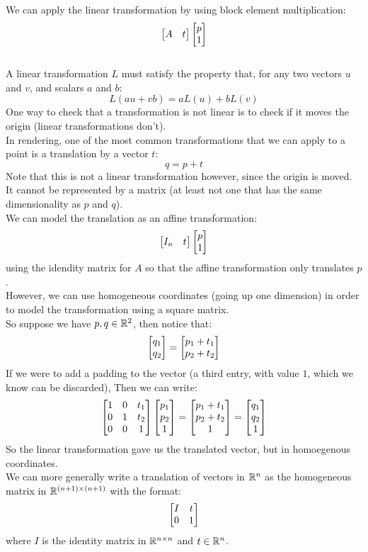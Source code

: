 \documentclass[12pt]{article}
\begin{document}
We can apply the linear transformation
by using block element multiplication:
\[ \begin{bmatrix} {A} & {t} \end{bmatrix} \begin{bmatrix} {p}\\{1} \end{bmatrix} \] \\

A linear transformation $L$ must satisfy the
property that, for any two vectors $u$ and $v$,
and scalars $a$ and $b$:
\[ L(au + vb) = aL(u) + bL(v) \]
One way to check that a transformation is not linear
is to check if it moves the origin (linear
transformations don't). \\

In rendering, one of the most common transformations
that we can apply to a point is a translation
by a vector $t$:
\[ q = p + t \]
Note that this is not a linear transformation however,
since the origin is moved. \\
It cannot be represented by a matrix
(at least not one that has the same dimensionality
as $p$ and $q$). \\

We can model the translation as an affine
transformation:
\[ \begin{bmatrix} {I_n}& {t} \end{bmatrix} \begin{bmatrix} {p}\\{1} \end{bmatrix} \]
using the idendity matrix for $A$
so that the affine transformation only translates
$p$. \\

However, we can use homogeneous coordinates
(going up one dimension)
in order to model the transformation using a 
square matrix. \\
So suppose we have $p, q \in \mathbb{R}^2$,
then notice that:
\[ \begin{bmatrix} {q_1}\\{q_2} \end{bmatrix} = \begin{bmatrix} {p_1 + t_1}\\{p_2 + t_2} \end{bmatrix} \]
If we were to add a padding to the vector
(a third entry, with value $1$, 
which we know can be discarded),
Then we can write:
\[ \begin{bmatrix} {1}&{0}&{t_1}\\{0}&{1}&{t_2}\\{0}&{0}&{1} \end{bmatrix}
\begin{bmatrix} {p_1}\\{p_2}\\{1} \end{bmatrix} = 
\begin{bmatrix} {p_1 + t_1}\\{p_2 + t_2}\\{1} \end{bmatrix}
= \begin{bmatrix} {q_1}\\{q_2}\\{1} \end{bmatrix} \]
So the linear transformation gave us the translated vector,
but in homoegenous coordinates. \\
We can more generally write a translation of
vectors in $\mathbb{R}^n$ as the homogeneous matrix in
$\mathbb{R}^{(n+1) \times (n+1)}$ with the format:
\[ \begin{bmatrix} {I} & {t} \\{0} & {1} \end{bmatrix} \]
where $I$ is the identity matrix in $\mathbb{R}^{n \times n}$
and $t \in \mathbb{R}^n$. \\
\end{document}
